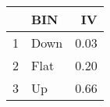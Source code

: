 \begin{table}[ht]
\centering
\begin{tabular}{rlr}
  \hline
 & BIN & IV \\ 
  \hline
1 & Down & 0.03 \\ 
  2 & Flat & 0.20 \\ 
  3 & Up & 0.66 \\ 
   \hline
\end{tabular}
\end{table}
